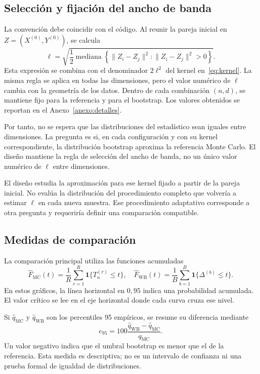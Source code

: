 \documentclass[11pt,a4paper]{article}
\begin{document}
\subsection{Selección y fijación del ancho de banda}
La convención debe coincidir con el código. Al reunir la pareja inicial en $Z=(X^{(0)},Y^{(0)})$, se calcula
\begin{equation}\label{eq:ell}
\ell=\sqrt{\frac{1}{2}\operatorname{mediana}
\left\{\|Z_i-Z_j\|^2:\|Z_i-Z_j\|^2>0\right\}}.
\end{equation}
Esta expresión se combina con el denominador $2\ell^2$ del kernel en~\eqref{eq:kernel}. La misma regla se aplica en todas las dimensiones, pero el valor numérico de $\ell$ cambia con la geometría de los datos. Dentro de cada combinación $(n,d)$, se mantiene fijo para la referencia y para el bootstrap. Los valores obtenidos se reportan en el Anexo~\ref{anexo:detalles}.

Por tanto, no se espera que las distribuciones del estadístico sean iguales entre dimensiones. La pregunta es si, en cada configuración y con su kernel correspondiente, la distribución bootstrap aproxima la referencia Monte Carlo. El diseño mantiene la regla de selección del ancho de banda, no un único valor numérico de $\ell$ entre dimensiones.

El diseño estudia la aproximación para ese kernel fijado a partir de la pareja inicial. No evalúa la distribución del procedimiento completo que volvería a estimar $\ell$ en cada nueva muestra. Ese procedimiento adaptativo corresponde a otra pregunta y requeriría definir una comparación compatible.

\subsection{Medidas de comparación}
La comparación principal utiliza las funciones acumuladas
\begin{equation}
\widehat F_{\mathrm{MC}}(t)=\frac{1}{R}\sum_{r=1}^{R}\mathbf 1\{T_n^{(r)}\le t\},
\quad
\widehat F_{\mathrm{WB}}(t)=\frac{1}{B}\sum_{b=1}^{B}\mathbf 1\{\Delta^{(b)}\le t\}.
\end{equation}
En estos gráficos, la línea horizontal en $0{,}95$ indica una probabilidad acumulada. El valor crítico se lee en el eje horizontal donde cada curva cruza ese nivel.

Si $\widehat q_{\mathrm{MC}}$ y $\widehat q_{\mathrm{WB}}$ son los percentiles 95 empíricos, se resume su diferencia mediante
\begin{equation}
e_{95}=100\frac{\widehat q_{\mathrm{WB}}-\widehat q_{\mathrm{MC}}}
{\widehat q_{\mathrm{MC}}}.
\end{equation}
Un valor negativo indica que el umbral bootstrap es menor que el de la referencia. Esta medida es descriptiva; no es un intervalo de confianza ni una prueba formal de igualdad de distribuciones.
\end{document}
